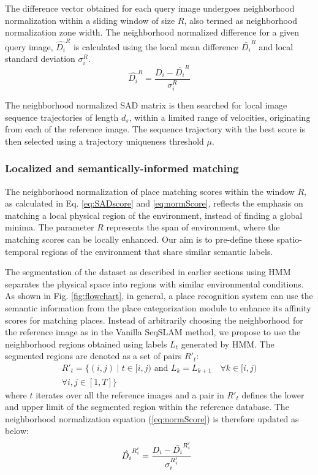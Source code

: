 \documentclass[letterpaper, 10 pt, conference]{ieeeconf}  %
\begin{document}
The difference vector obtained for each query image undergoes neighborhood normalization within a sliding window of size $R$, also termed as neighborhood normalization zone width. The neighborhood normalized difference for a given query image, $\hat{D_i}^R$ is calculated using the local mean difference $\bar{D_i}^R$ and local standard deviation $\sigma_i^R$.
\begin{equation}
 \hat{D_i}^R = \frac{D_i-\bar{D_i}^R}{\sigma_i^R}
 \label{eq:normScore}
\end{equation}

The neighborhood normalized SAD matrix is then searched for local image sequence trajectories of length $d_s$, within a limited range of velocities, originating from each of the reference image. The sequence trajectory with the best score is then selected using a trajectory uniqueness threshold $\mu$.

\subsubsection{Localized and semantically-informed matching}
The neighborhood normalization of place matching scores within the window $R$, as calculated in Eq. \ref{eq:SADscore} and \ref{eq:normScore}, reflects the emphasis on matching a local physical region of the environment, instead of finding a global minima. The parameter $R$ represents the span of environment, where the matching scores can be locally enhanced. Our aim is to pre-define these spatio-temporal regions of the environment that share similar semantic labels. 

The segmentation of the dataset as described in earlier sections using HMM separates the physical space into regions with similar environmental conditions. As shown in Fig. \ref{fig:flowchart}, in general, a place recognition system can use the semantic information from the place categorization module to enhance its affinity scores for matching places. Instead of arbitrarily choosing the neighborhood for the reference image as in the Vanilla SeqSLAM method, we propose to use the neighborhood regions obtained using labels $L_t$ generated by HMM. The segmented regions are denoted as a set of pairs $R'_t$:
\begin{equation}
\begin{split}
 R'_t = \{ (i,j) \mid t\in [i,j) \text{ and } L_{k} = L_{k+1} \quad \forall k \in [i,j) \\
 \forall i,j \in [1,T] \}
\end{split}
\end{equation}
where $t$ iterates over all the reference images and a pair in $R'_t$ defines the lower and upper limit of the segmented region within the reference database. The neighborhood normalization equation (\ref{eq:normScore}) is therefore updated as below: 
\begin{equation}
 \hat{D_i}^{R'_i} = \frac{D_i-\bar{D_i}^{R'_i}}{\sigma_i^{R'_i}} \hspace{0.2cm}
 \label{eq:normScoreNew}
\end{equation}
\end{document}
